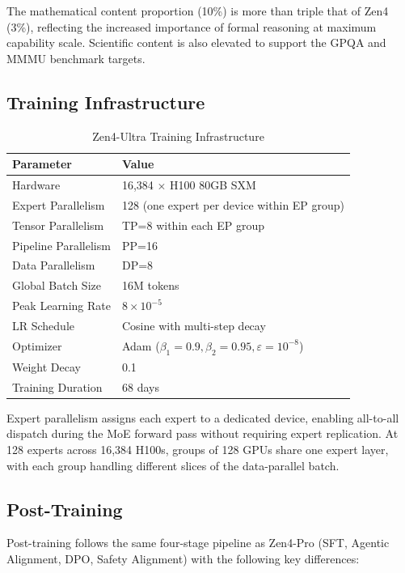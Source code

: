 \documentclass[11pt,a4paper]{article}
\begin{document}
The mathematical content proportion (10\%) is more than triple that of Zen4 (3\%),
reflecting the increased importance of formal reasoning at maximum capability scale.
Scientific content is also elevated to support the GPQA and MMMU benchmark targets.

\subsection{Training Infrastructure}

\begin{table}[H]
\centering
\begin{tabular}{ll}
\toprule
\textbf{Parameter} & \textbf{Value} \\
\midrule
Hardware               & 16,384 $\times$ H100 80GB SXM \\
Expert Parallelism     & 128 (one expert per device within EP group) \\
Tensor Parallelism     & TP=8 within each EP group \\
Pipeline Parallelism   & PP=16 \\
Data Parallelism       & DP=8 \\
Global Batch Size      & 16M tokens \\
Peak Learning Rate     & $8 \times 10^{-5}$ \\
LR Schedule            & Cosine with multi-step decay \\
Optimizer              & Adam ($\beta_1=0.9, \beta_2=0.95, \varepsilon=10^{-8}$) \\
Weight Decay           & 0.1 \\
Training Duration      & 68 days \\
\bottomrule
\end{tabular}
\caption{Zen4-Ultra Training Infrastructure}
\end{table}

Expert parallelism assigns each expert to a dedicated device, enabling all-to-all dispatch
during the MoE forward pass without requiring expert replication. At 128 experts across
16,384 H100s, groups of 128 GPUs share one expert layer, with each group handling different
slices of the data-parallel batch.

\subsection{Post-Training}

Post-training follows the same four-stage pipeline as Zen4-Pro (SFT, Agentic Alignment,
DPO, Safety Alignment) with the following key differences:
\end{document}
